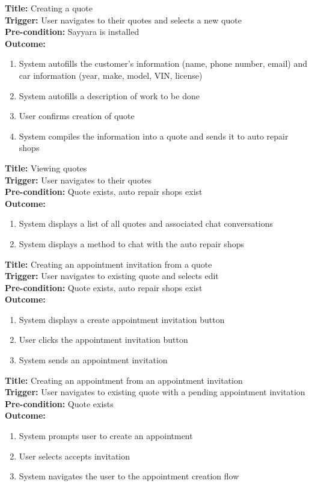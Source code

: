 \documentclass[12pt]{article}
\begin{document}
\textbf{Title:} Creating a quote\\
\textbf{Trigger:} User navigates to their quotes and selects a new quote\\
\textbf{Pre-condition:} Sayyara is installed\\
\textbf{Outcome:}
\begin{enumerate}
	\item System autofills the customer's information (name, phone number, email) and car information (year,
	      make, model, VIN, license)
	\item System autofills a description of work to be done
	\item User confirms creation of quote
	\item System compiles the information into a quote and sends it to auto repair shops
\end{enumerate}

\textbf{Title:} Viewing quotes\\
\textbf{Trigger:} User navigates to their quotes\\
\textbf{Pre-condition:} Quote exists, auto repair shops exist\\
\textbf{Outcome:}
\begin{enumerate}
	\item System displays a list of all quotes and associated chat conversations
	\item System displays a method to chat with the auto repair shops
\end{enumerate}

\textbf{Title:} Creating an appointment invitation from a quote\\
\textbf{Trigger:} User navigates to existing quote and selects edit\\
\textbf{Pre-condition:} Quote exists, auto repair shops exist\\
\textbf{Outcome:}
\begin{enumerate}
	\item System displays a create appointment invitation button
	\item User clicks the appointment invitation button
	\item System sends an appointment invitation
\end{enumerate}

\textbf{Title:} Creating an appointment from an appointment invitation\\
\textbf{Trigger:} User navigates to existing quote with a pending appointment invitation\\
\textbf{Pre-condition:} Quote exists\\
\textbf{Outcome:}
\begin{enumerate}
	\item System prompts user to create an appointment
	\item User selects accepts invitation
	\item System navigates the user to the appointment creation flow
\end{enumerate}
\end{document}
